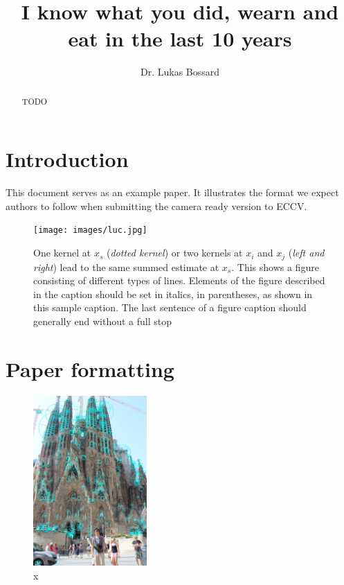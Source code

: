 \documentclass[runningheads]{llncs}
\begin{document}
\pagestyle{headings}
\mainmatter
\title{I know what you did, wearn and eat in the last 10 years} %



\author{Dr. Lukas Bossard}


\maketitle

\begin{abstract}
TODO
\end{abstract}


\section{Introduction}




This document serves as an example paper. It illustrates the format
we expect authors to follow when submitting the camera ready version to ECCV. 

\begin{figure}
\centering
\texttt{[image: images/luc.jpg]}
\caption{One kernel at $x_s$ ({\it dotted kernel}) or two kernels at
$x_i$ and $x_j$ ({\it left and right}) lead to the same summed estimate
at $x_s$. This shows a figure consisting of different types of
lines. Elements of the figure described in the caption should be set in
italics,
in parentheses, as shown in this sample caption. The last
sentence of a figure caption should generally end without a full stop}
\label{fig:example}
\end{figure}


\section{Paper formatting}


\begin{figure} \centering \includegraphics[height=6.5cm]{images/dengxin.jpg}
\caption{x} \label{fig:example} \end{figure}
\end{document}
